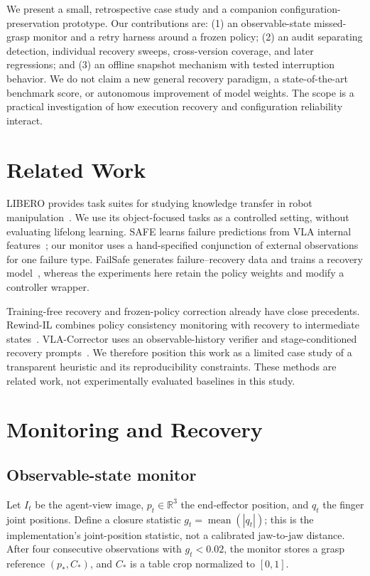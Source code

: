 \documentclass[10pt,twocolumn]{article}
\begin{document}
We present a small, retrospective case study and a companion configuration-preservation prototype. Our contributions are: (1) an observable-state missed-grasp monitor and a retry harness around a frozen policy; (2) an audit separating detection, individual recovery sweeps, cross-version coverage, and later regressions; and (3) an offline snapshot mechanism with tested interruption behavior. We do not claim a new general recovery paradigm, a state-of-the-art benchmark score, or autonomous improvement of model weights. The scope is a practical investigation of how execution recovery and configuration reliability interact.

\section{Related Work}
LIBERO provides task suites for studying knowledge transfer in robot manipulation~\cite{libero}. We use its object-focused tasks as a controlled setting, without evaluating lifelong learning. SAFE learns failure predictions from VLA internal features~\cite{safe}; our monitor uses a hand-specified conjunction of external observations for one failure type. FailSafe generates failure--recovery data and trains a recovery model~\cite{failsafe}, whereas the experiments here retain the policy weights and modify a controller wrapper.

Training-free recovery and frozen-policy correction already have close precedents. Rewind-IL combines policy consistency monitoring with recovery to intermediate states~\cite{rewind}. VLA-Corrector uses an observable-history verifier and stage-conditioned recovery prompts~\cite{corrector}. We therefore position this work as a limited case study of a transparent heuristic and its reproducibility constraints. These methods are related work, not experimentally evaluated baselines in this study.

\section{Monitoring and Recovery}
\subsection{Observable-state monitor}
Let $I_t$ be the agent-view image, $p_t\in\mathbb{R}^3$ the end-effector position, and $q_t$ the finger joint positions. Define a closure statistic $g_t=\operatorname{mean}(|q_t|)$; this is the implementation's joint-position statistic, not a calibrated jaw-to-jaw distance. After four consecutive observations with $g_t<0.02$, the monitor stores a grasp reference $(p_*,C_*)$, and $C_*$ is a table crop normalized to $[0,1]$.
\end{document}
